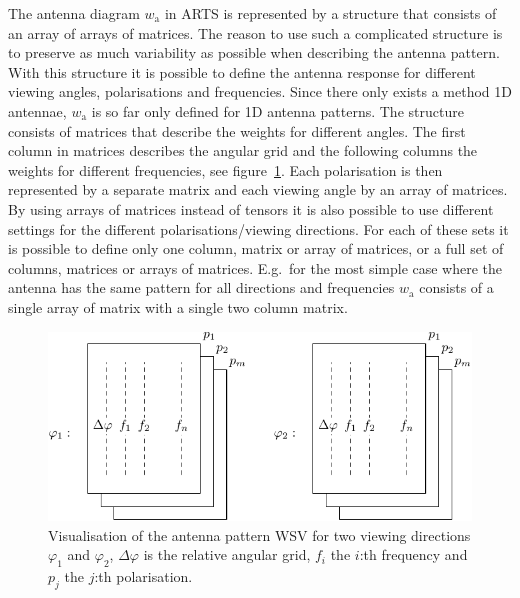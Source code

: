
The antenna diagram $w_\mathrm{a}$ in ARTS is represented by a structure  that consists of an array of arrays of matrices. The reason to use such a complicated structure is to preserve as much variability as possible when describing the antenna pattern. With this structure it is possible to define the antenna response for different viewing angles, polarisations and frequencies. 
Since there only exists a method 1D antennae, $w_\mathrm{a}$ is so far only defined for 1D antenna patterns. The structure consists of matrices that describe the weights for different angles. The first column in matrices describes the angular grid and the following columns the weights for different frequencies, see figure~\ref{fig:sensor:ant_diag}. Each polarisation is then represented by a separate matrix and each viewing angle by an array of matrices. By using arrays of matrices instead of tensors it is also possible to use different settings for the different polarisations/viewing directions. For each of these sets it is possible to define only one column, matrix or array of matrices, or a full set of columns, matrices or arrays of matrices. E.g.~for the most simple case where the antenna has the same pattern for all directions and frequencies $w_\mathrm{a}$ consists of a single array of matrix with a single two column matrix.
\begin{figure}[!ht]
\label{fig:sensor:ant_diag}
\begin{center}
  \includegraphics*{Figs/sensor/ant_diag}
  \caption{Visualisation of the antenna pattern WSV  for   
  two viewing directions $\varphi_1$ and $\varphi_2$, $\Delta\varphi$ is the relative   
  angular grid, $f_i$ the $i$:th frequency and $p_j$ the $j$:th polarisation.}
\end{center}
\end{figure}

